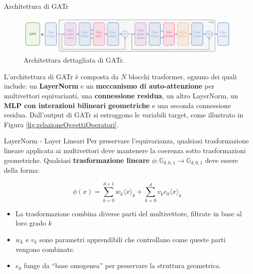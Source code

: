 \begin{frame}{Architettura di GATr}
    \begin{figure}
        \centering
        \includegraphics[width=1\textwidth]{../Images/GatrArchitecture.png}
        \caption{Architettura dettagliata di GATr.}
    \end{figure}
    
    L'architettura di GATr è composta da \( N \) blocchi trasformer, ognuno dei quali 
    include: un \textbf{LayerNorm} e un \textbf{meccanismo di auto-attenzione} per multivettori 
    equivarianti, una \textbf{connessione residua}, un altro LayerNorm, un \textbf{MLP con interazioni 
    bilineari geometriche} e una seconda connessione residua. 
    Dall’output di GATr si estraggono le variabili target, come illustrato in 
    Figura \ref{fig:relazioneOggettiOperatori}.
\end{frame}

\begin{frame}{LayerNorm - Layer Lineari}  
    Per preservare l’equivarianza, qualsiasi trasformazione lineare applicata ai 
    multivettori deve mantenere la coerenza sotto trasformazioni geometriche. 
    Qualsiasi \textbf{trasformazione lineare} 
    \( \phi : \mathbb{G}_{d,0,1} \rightarrow \mathbb{G}_{d,0,1} \) deve essere 
    della forma:

    \[
        \phi(x) = \sum_{k = 0}^{d+1} w_k {\langle x \rangle}_k + 
        \sum_{k = 0}^{d} v_k e_0 {\langle x \rangle}_k
    \]     

    \begin{itemize}
        \item La trasformazione combina diverse parti del multivettore, filtrate in base 
        al loro grado \( k \)
        \item \( w_k \) e \( v_k \) sono parametri apprendibili che controllano come 
        queste parti vengono combinate.
        \item \( e_0 \) funge da “base omogenea” per preservare la struttura geometrica.
    \end{itemize}
\end{frame}

